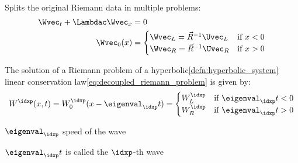 \begin{defnbox}\nospacing
    \begin{defn}\label{defn:decoupled_riemann_problem}\leavevmode\\
        Splits the original Riemann data in multiple problems:
        \begin{align}
          \Wvec_{t}+\Lambdac\Wvec_{x}&=0\nonumber\\
          \Wvec_{0}(x)&=\begin{cases}\Wvec_{L}=\vec{R}^{-1}\Uvec_{L}&\text{if }x<0\\
                \Wvec_{R}=\vec{R}^{-1}\Uvec_{R}&\text{if }x>0
              \end{cases}\label{eq:decoupled_riemann_problem}
        \end{align}
        \begin{figure}[H]
            \vspace{-2em}
            \centering{
              \def\svgwidth{150pt}
              \resizebox{0.7\linewidth}{!}{}
            }
        \end{figure}
    \end{defn}
\end{defnbox}
\begin{corbox}\nospacing
    \begin{cor}\label{cor:riemann_hyper_lin_cons_law}
        The solution of a Riemann problem of a hyperbolic\cref{defn:hyperbolic_system} linear conservation law\cref{eq:decoupled_riemann_problem} is given by:
        \begin{align}
          W^{\idxp}(x,t)=W_{0}^{\idxp}(x-\eigenval_{\idxp}t)=
          \begin{cases}
              W_{L}^{\idxp}&\text{if }\eigenval_{\idxp}t<0\\
              W_{R}^{\idxp}&\text{if }\eigenval_{\idxp}t>0
          \end{cases}
        \end{align}
    \end{cor}
\end{corbox}
\begin{explanationbox}\nospacing
    \begin{explanation}\leavevmode
        \begin{itemizenosep}
            \item $\eigenval_{\idxp}$ speed of the wave
            \item $\eigenval_{\idxp}t$ is called the $\idxp$-th wave
        \end{itemizenosep}
    \end{explanation}
\end{explanationbox}
